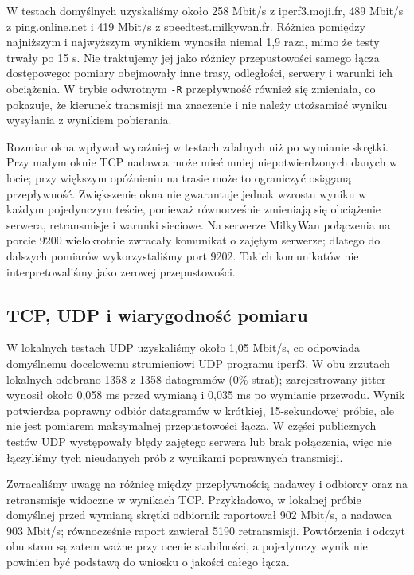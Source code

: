 \documentclass[11pt,a4paper]{article}
\begin{document}
W testach domyślnych uzyskaliśmy około 258 Mbit/s z iperf3.moji.fr,
489 Mbit/s z ping.online.net i 419 Mbit/s z speedtest.milkywan.fr. Różnica
pomiędzy najniższym i najwyższym wynikiem wynosiła niemal 1,9 raza, mimo że
testy trwały po 15 s. Nie traktujemy jej jako różnicy przepustowości samego
łącza dostępowego: pomiary obejmowały inne trasy, odległości, serwery i warunki
ich obciążenia. W trybie odwrotnym \texttt{-R} przepływność również się
zmieniała, co pokazuje, że kierunek transmisji ma znaczenie i nie należy
utożsamiać wyniku wysyłania z wynikiem pobierania.

Rozmiar okna wpływał wyraźniej w testach zdalnych niż po wymianie skrętki.
Przy małym oknie TCP nadawca może mieć mniej niepotwierdzonych danych w locie;
przy większym opóźnieniu na trasie może to ograniczyć osiąganą przepływność.
Zwiększenie okna nie gwarantuje jednak wzrostu wyniku w każdym pojedynczym
teście, ponieważ równocześnie zmieniają się obciążenie serwera, retransmisje
i warunki sieciowe. Na serwerze MilkyWan połączenia na porcie 9200 wielokrotnie
zwracały komunikat o zajętym serwerze; dlatego do dalszych pomiarów wykorzystaliśmy
port 9202. Takich komunikatów nie interpretowaliśmy jako zerowej przepustowości.

\subsection{TCP, UDP i wiarygodność pomiaru}

W lokalnych testach UDP uzyskaliśmy około 1,05 Mbit/s, co odpowiada domyślnemu
docelowemu strumieniowi UDP programu iperf3. W obu zrzutach lokalnych odebrano
1358 z 1358 datagramów (0\% strat); zarejestrowany jitter wynosił około
0,058 ms przed wymianą i 0,035 ms po wymianie przewodu. Wynik potwierdza
poprawny odbiór datagramów w krótkiej, 15-sekundowej próbie, ale nie jest
pomiarem maksymalnej przepustowości łącza. W części publicznych testów UDP
występowały błędy zajętego serwera lub brak połączenia, więc nie łączyliśmy
tych nieudanych prób z wynikami poprawnych transmisji.

Zwracaliśmy uwagę na różnicę między przepływnością nadawcy i odbiorcy oraz na
retransmisje widoczne w wynikach TCP. Przykładowo, w lokalnej próbie domyślnej
przed wymianą skrętki odbiornik raportował 902 Mbit/s, a nadawca 903 Mbit/s;
równocześnie raport zawierał 5190 retransmisji. Powtórzenia i odczyt obu stron
są zatem ważne przy ocenie stabilności, a pojedynczy wynik nie powinien być
podstawą do wniosku o jakości całego łącza.
\end{document}

